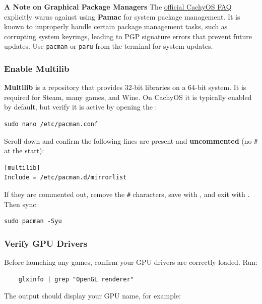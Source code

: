 \documentclass{article}
\newcommand{\code}[1]{\colorbox{codebg}{\texttt{#1}}}
\begin{document}
\begin{callout}{\textbf{A Note on Graphical Package Managers}}
  The \href{https://wiki.cachyos.org/cachyos_basic/faq/}{official CachyOS FAQ}
  explicitly warns against using \textbf{Pamac} for system package management.
  It is known to improperly handle certain package management tasks, such as
  corrupting system keyrings, leading to PGP signature errors that prevent future
  updates. Use \code{pacman} or \code{paru} from the terminal for system updates.
\end{callout}

\subsubsection{Enable Multilib}

\textbf{Multilib} is a repository that provides 32-bit libraries on a 64-bit system.
It is required for Steam, many games, and Wine. On CachyOS it is typically enabled
by default, but verify it is active by opening the :

\begin{verbatim}
sudo nano /etc/pacman.conf
\end{verbatim}

Scroll down and confirm the following lines are present and \textbf{uncommented}
(no \code{\#} at the start):

\begin{verbatim}
[multilib]
Include = /etc/pacman.d/mirrorlist
\end{verbatim}

If they are commented out, remove the \code{\#} characters, save with
, and exit with . Then sync:

\begin{verbatim}
sudo pacman -Syu
\end{verbatim}

\subsubsection{Verify GPU Drivers}

Before launching any games, confirm your GPU drivers are correctly loaded. Run:

\begin{verbatim}
	glxinfo | grep "OpenGL renderer"
\end{verbatim}

The output should display your GPU name, for example:
\end{document}
